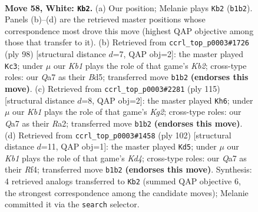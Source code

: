 \documentclass[11pt]{article}
\begin{document}
\clearpage

\begin{figure}[p]\centering
\begin{subfigure}{0.46\textwidth}\centering
\resizebox{\linewidth}{!}{%
\newchessgame
\chessboard[
  setfen={3r4/Q7/3k4/6P1/4P2P/8/8/1K6 w - - 1 58},
  showmover=false,
  pgfstyle=straightmove, color=movearrow, markmove={b1-b2}
]}
\caption{}
\end{subfigure}\hfill
\begin{subfigure}{0.46\textwidth}\centering
\resizebox{\linewidth}{!}{%
\newchessgame
\chessboard[
  setfen={1k2r3/8/8/P2B4/1P6/8/1K6/8 w - - 5 50},
  showmover=false,
  pgfstyle=straightmove, color=movearrow, markmove={b2-c3}
]}
\caption{}
\end{subfigure}
\\[4pt]
\begin{subfigure}{0.46\textwidth}\centering
\resizebox{\linewidth}{!}{%
\newchessgame
\chessboard[
  setfen={8/6k1/8/6p1/8/5p1P/r7/1R5K b - - 1 58},
  showmover=false,
  pgfstyle=straightmove, color=movearrow, markmove={g7-h6}
]}
\caption{}
\end{subfigure}\hfill
\begin{subfigure}{0.46\textwidth}\centering
\resizebox{\linewidth}{!}{%
\newchessgame
\chessboard[
  setfen={8/1k5r/8/pP6/P2K1R2/8/8/8 w - - 1 52},
  showmover=false,
  pgfstyle=straightmove, color=movearrow, markmove={d4-d5}
]}
\caption{}
\end{subfigure}
\caption{\textbf{Move 58, White: \texttt{Kb2}.} (a) Our position; Melanie plays \texttt{Kb2} (\texttt{b1b2}). Panels (b)--(d) are the retrieved master positions whose correspondence most drove this move (highest QAP objective among those that transfer to it). (b) Retrieved from \texttt{ccrl\_top\_p0003\#1726} (ply 98) [structural distance $d$=7, QAP obj=2]: the master played \texttt{Kc3}; under $\mu$ our \emph{Kb1} plays the role of that game's \emph{Kb2}; cross-type roles: our \emph{Q}a7 as their \emph{B}d5; transferred move \texttt{b1b2} \textbf{(endorses this move)}. (c) Retrieved from \texttt{ccrl\_top\_p0003\#2281} (ply 115) [structural distance $d$=8, QAP obj=2]: the master played \texttt{Kh6}; under $\mu$ our \emph{Kb1} plays the role of that game's \emph{Kg2}; cross-type roles: our \emph{Q}a7 as their \emph{R}a2; transferred move \texttt{b1b2} \textbf{(endorses this move)}. (d) Retrieved from \texttt{ccrl\_top\_p0003\#1458} (ply 102) [structural distance $d$=11, QAP obj=1]: the master played \texttt{Kd5}; under $\mu$ our \emph{Kb1} plays the role of that game's \emph{Kd4}; cross-type roles: our \emph{Q}a7 as their \emph{R}f4; transferred move \texttt{b1b2} \textbf{(endorses this move)}. Synthesis: 4 retrieved analogs transferred to \texttt{Kb2} (summed QAP objective 6, the strongest correspondence among the candidate moves); Melanie committed it via the \texttt{search} selector.}
\label{fig:thought-m114}
\end{figure}
\end{document}
